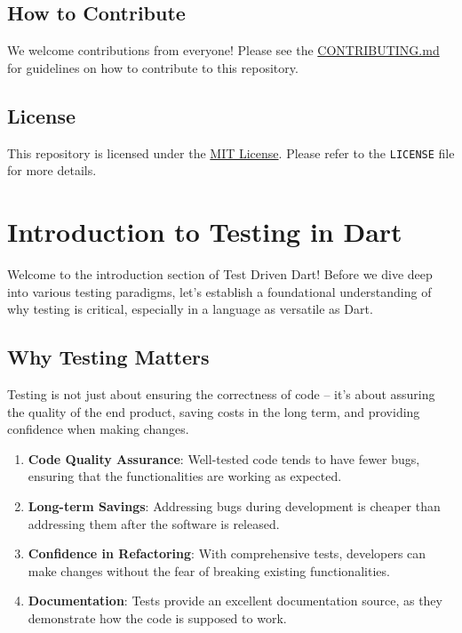 \documentclass[
]{article}
\providecommand{\tightlist}{%
  \setlength{\itemsep}{0pt}\setlength{\parskip}{0pt}}
\begin{document}
\subsection{How to Contribute}\label{how-to-contribute}

We welcome contributions from everyone! Please see the
\href{./CONTRIBUTING.md}{CONTRIBUTING.md} for guidelines on how to
contribute to this repository.

\subsection{License}\label{license}

This repository is licensed under the \href{./LICENSE}{MIT License}.
Please refer to the \texttt{LICENSE} file for more details.

\newpage
\section{Introduction to Testing in
Dart}\label{introduction-to-testing-in-dart}

Welcome to the introduction section of Test Driven Dart! Before we dive
deep into various testing paradigms, let's establish a foundational
understanding of why testing is critical, especially in a language as
versatile as Dart.

\subsection{Why Testing Matters}\label{why-testing-matters}

Testing is not just about ensuring the correctness of code -- it's about
assuring the quality of the end product, saving costs in the long term,
and providing confidence when making changes.

\begin{enumerate}
\def\labelenumi{\arabic{enumi}.}
\tightlist
\item
  \textbf{Code Quality Assurance}: Well-tested code tends to have fewer
  bugs, ensuring that the functionalities are working as expected.
\item
  \textbf{Long-term Savings}: Addressing bugs during development is
  cheaper than addressing them after the software is released.
\item
  \textbf{Confidence in Refactoring}: With comprehensive tests,
  developers can make changes without the fear of breaking existing
  functionalities.
\item
  \textbf{Documentation}: Tests provide an excellent documentation
  source, as they demonstrate how the code is supposed to work.
\end{enumerate}
\end{document}
